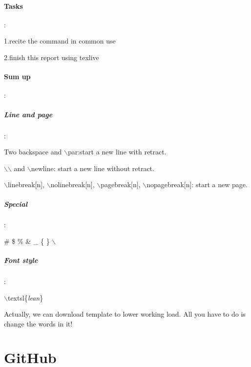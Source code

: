 \documentclass{report}
\begin{document}
	\paragraph{Tasks}:\par
	1.recite the command in common use\par
	2.finish this report using texlive
	\paragraph{Sum up}:\par
	\subparagraph{Line and page}:\par
	Two backspace and $\backslash$par:start a new line with retract.\par
	$\backslash$$\backslash$ and $\backslash$newline: start a new line without retract. \par
	$\backslash$linebreak[n], $\backslash$nolinebreak[n], $\backslash$pagebreak[n], $\backslash$nopagebreak[n]: start a new page.\par
	\subparagraph{Special}:\par
	\# \$ \% \& \_ \{ \} $\backslash$\par
	\subparagraph{Font style}:\par
	$\backslash$textsl\{\textsl{lean}\}\par
	Actually, we can download template to lower working load. All you have to do is change the words in it!
\section{GitHub}
\end{document}

